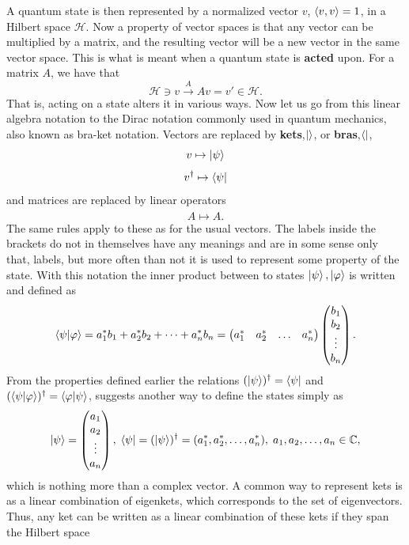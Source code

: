 A quantum state is then represented by a normalized vector $v$, $\langle v,v \rangle = 1$, in a Hilbert space $\mathcal{H}$. Now a property of vector spaces is that any vector can be multiplied by a matrix, and the resulting vector will be a new vector in the same vector space. This is what is meant when a quantum state is \textbf{acted} upon. For a matrix $A$, we have that 
\begin{equation}
\mathcal{H} \ni v  \xrightarrow{A} Av = v' \in \mathcal{H}.
\end{equation}
That is, acting on a state alters it in various ways. Now let us go from this linear algebra notation to the Dirac notation commonly used in quantum mechanics, also known as bra-ket notation.
Vectors are replaced by \textbf{kets},$\ket{}$, or \textbf{bras},$\bra{}$, $$v \mapsto \ket{\psi}$$
$$v^\dagger \mapsto \bra{\psi}$$
and matrices are replaced by linear operators
$$A \mapsto \hat{A}.$$
The same rules apply to these as for the usual vectors.
The labels inside the brackets do not in themselves have any meanings and are in some sense only that, labels, but more often than not it is used to represent some property of the state. With this notation the inner product between to states $\ket{\psi},\ket{\varphi}$ is written and defined as
\begin{equation}
\bra{\psi}\ket{\varphi} = a_1^{*}b_1 + a_2^{*}b_2 + \dots + a_n^{*}b_n = \begin{pmatrix} a_1^{*} & a_2^{*} & \dots & a_n^{*}\end{pmatrix} \begin{pmatrix} b_1 \\ b_2 \\ \vdots \\ b_n\end{pmatrix}.
\end{equation}
From the properties defined earlier the relations $(\ket{\psi})^\dagger = \bra{\psi}$ and $ (\bra{\psi}\ket{\varphi})^\dagger = \bra{\varphi}\ket{\psi}$, suggests another way to define the states simply as
\begin{equation}
\ket{\psi} = \begin{pmatrix}
a_1 \\ a_2 \\ \vdots \\ a_n
\end{pmatrix},\;
\bra{\psi} = (\ket{\psi})^{\dagger} = (a_1^{*}, a_2^{*}, \dots, a_n^{*}),\; a_1,a_2,\dots,a_n \in \mathbb{C},
\end{equation}
which is nothing more than a complex vector. A common way to represent kets is as a linear combination of eigenkets, which corresponds to the set of eigenvectors. Thus, any ket can be written as a linear combination of these kets if they span the Hilbert space
